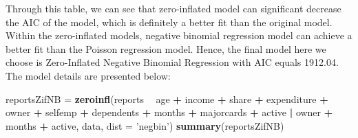 \documentclass[
]{article}
\newenvironment{Shaded}{\begin{snugshade}}{\end{snugshade}}
\newcommand{\DataTypeTok}[1]{\textcolor[rgb]{0.13,0.29,0.53}{#1}}
\newcommand{\KeywordTok}[1]{\textcolor[rgb]{0.13,0.29,0.53}{\textbf{#1}}}
\newcommand{\NormalTok}[1]{#1}
\newcommand{\OperatorTok}[1]{\textcolor[rgb]{0.81,0.36,0.00}{\textbf{#1}}}
\newcommand{\StringTok}[1]{\textcolor[rgb]{0.31,0.60,0.02}{#1}}
\begin{document}
Through this table, we can see that zero-inflated model can significant
decrease the AIC of the model, which is definitely a better fit than the
original model. Within the zero-inflated models, negative binomial
regression model can achieve a better fit than the Poisson regression
model. Hence, the final model here we choose is Zero-Inflated Negative
Binomial Regression with AIC equals 1912.04. The model details are
presented below:

\begin{Shaded}
\begin{Highlighting}[]
\NormalTok{reportsZifNB =}\StringTok{ }\KeywordTok{zeroinfl}\NormalTok{(reports }\OperatorTok{~}\StringTok{ }\NormalTok{age }\OperatorTok{+}\StringTok{ }\NormalTok{income }\OperatorTok{+}\StringTok{ }\NormalTok{share }\OperatorTok{+}\StringTok{ }\NormalTok{expenditure }\OperatorTok{+}\StringTok{ }
\StringTok{                                  }\NormalTok{owner }\OperatorTok{+}\StringTok{ }\NormalTok{selfemp }\OperatorTok{+}\StringTok{ }\NormalTok{dependents }\OperatorTok{+}\StringTok{ }\NormalTok{months }\OperatorTok{+}\StringTok{ }
\StringTok{                                  }\NormalTok{majorcards }\OperatorTok{+}\StringTok{ }\NormalTok{active }\OperatorTok{|}\StringTok{ }\NormalTok{owner }\OperatorTok{+}\StringTok{ }\NormalTok{months }\OperatorTok{+}\StringTok{ }\NormalTok{active, }
\NormalTok{                        data, }\DataTypeTok{dist =} \StringTok{'negbin'}\NormalTok{)}
\KeywordTok{summary}\NormalTok{(reportsZifNB)}
\end{Highlighting}
\end{Shaded}
\end{document}
